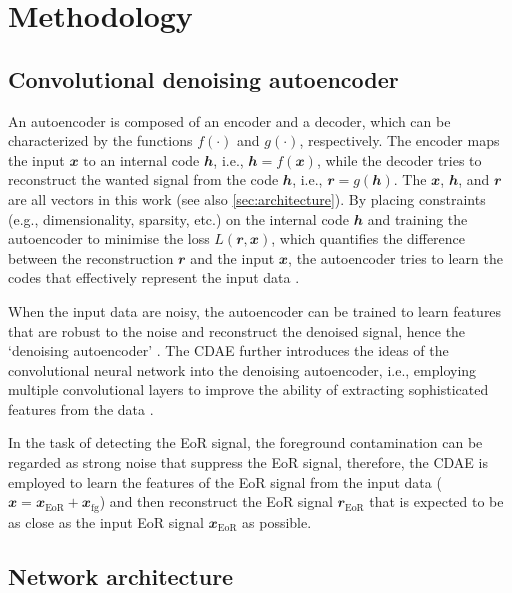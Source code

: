 \documentclass[letters,a4paper,fleqn,usenatbib]{mnras}
\newcommand{\R}[1]{\mathrm{#1}}
\newcommand{\B}[1]{\mathbfit{#1}}
\begin{document}
\section{Methodology}
\label{sec:method}

\subsection{Convolutional denoising autoencoder}
\label{sec:cdae}

An autoencoder is composed of an encoder and a decoder, which can be
characterized by the functions $f(\cdot)$ and $g(\cdot)$, respectively.
The encoder maps the input $\B{x}$ to an internal code $\B{h}$, i.e.,
$\B{h} = f(\B{x})$, while the decoder tries to reconstruct the wanted
signal from the code $\B{h}$, i.e., $\B{r} = g(\B{h})$.
{\color{cyan}%
The $\B{x}$, $\B{h}$, and $\B{r}$ are all vectors in this work
(see also \autoref{sec:architecture}).}
By placing constraints (e.g., dimensionality, sparsity, etc.\@) on the
internal code $\B{h}$ and training the autoencoder to minimise the
loss $L(\B{r}, \B{x})$, which quantifies the difference between the
reconstruction $\B{r}$ and the input $\B{x}$, the autoencoder tries to
learn the codes that effectively represent the input data
\citep[e.g.,][chapter 14]{goodfellow2016}.
{\color{cyan}%
When the input data are noisy, the autoencoder can be trained to learn
features that are robust to the noise and reconstruct the denoised signal,
hence the `denoising autoencoder' \citep{vincent2008,vincent2010}.
The CDAE further introduces the ideas of the convolutional neural network
into the denoising autoencoder, i.e., employing multiple convolutional
layers to improve the ability of extracting sophisticated features
from the data \citep{du2017}.

In the task of detecting the EoR signal, the foreground contamination
can be regarded as strong noise that suppress the EoR signal, therefore,
the CDAE is employed to learn the features of the EoR signal from the
input data ($\B{x} = \B{x}_{\R{EoR}} + \B{x}_{\R{fg}}$) and then
reconstruct the EoR signal $\B{r}_{\R{EoR}}$ that is expected to be as
close as the input EoR signal $\B{x}_{\R{EoR}}$ as possible.} %


\subsection{Network architecture}
\label{sec:architecture}
\end{document}

